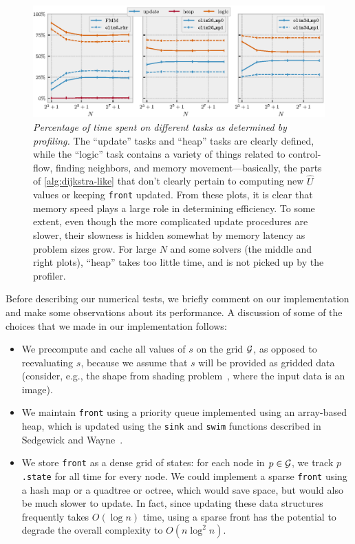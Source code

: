 \documentclass{article}
\begin{document}
\begin{figure}
  \includegraphics[width=\linewidth]{tasks.eps}%
  \caption{\emph{Percentage of time spent on different tasks as
      determined by profiling.} The ``update'' tasks and ``heap''
    tasks are clearly defined, while the ``logic'' task contains a
    variety of things related to control-flow, finding neighbors, and
    memory movement---basically, the parts of \cref{alg:dijkstra-like}
    that don't clearly pertain to computing new $\hat{U}$ values or
    keeping \texttt{front} updated. From these plots, it is clear that
    memory speed plays a large role in determining efficiency. To some
    extent, even though the more complicated update procedures are
    slower, their slowness is hidden somewhat by memory latency as
    problem sizes grow. For large $N$ and some solvers (the middle and
    right plots), ``heap'' takes too little time, and is not picked up
    by the profiler.}\label{fig:tasks}
\end{figure}

Before describing our numerical tests, we briefly comment on our
implementation and make some observations about its performance. A
discussion of some of the choices that we made in our implementation
follows:
\begin{itemize}
\item We precompute and cache all values of $s$ on the grid $\mathcal{G}$,
  as opposed to reevaluating $s$, because we assume that $s$ will be
  provided as gridded data (consider, e.g., the shape from shading
  problem~\cite{kimmel2001optimal}, where the input data is an image).
\item We maintain \texttt{front} using a priority queue implemented
  using an array-based heap, which is updated using the \texttt{sink}
  and \texttt{swim} functions described in Sedgewick and
  Wayne~\cite{sedgewick2011algorithms}.
\item We store \texttt{front} as a dense grid of states: for each node
  in $p \in \mathcal{G}$, we track $p$\texttt{.state} for all time for every
  node. We could implement a sparse \texttt{front} using a hash map or
  a quadtree or octree, which would save space, but would also be much
  slower to update. In fact, since updating these data structures
  frequently takes $O(\log n)$ time, using a sparse front has the
  potential to degrade the overall complexity to $O(n \log^2 n)$.
\end{itemize}
\end{document}
